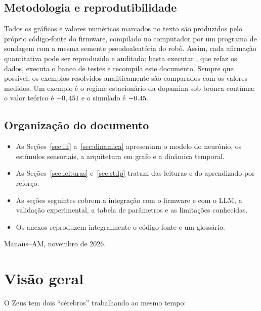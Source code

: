 \documentclass[11pt,a4paper]{article}
\DeclareRobustCommand{\arq}[1]{\texttt{\detokenize{#1}}}
\begin{document}
\subsection*{Metodologia e reprodutibilidade}

Todos os gráficos e valores numéricos marcados no texto são produzidos pelo próprio código-fonte do firmware, compilado no
computador por um programa de sondagem com a mesma semente pseudoaleatória do robô. Assim, cada afirmação quantitativa pode ser
reproduzida e auditada: basta executar \arq{docs/snn/gerar.bat}, que refaz os dados, executa o banco de testes e recompila este
documento. Sempre que possível, os exemplos resolvidos analiticamente são comparados com os valores medidos. Um exemplo é o regime
estacionário da dopamina sob bronca contínua: o valor teórico é $-0{,}451$ e o simulado é $-0.45$.

\subsection*{Organização do documento}

\begin{itemize}
  \item As Seções~\ref{sec:lif} a~\ref{sec:dinamica} apresentam o modelo do neurônio, os estímulos sensoriais, a arquitetura em
        grafo e a dinâmica temporal.
  \item As Seções~\ref{sec:leituras} e~\ref{sec:stdp} tratam das leituras e do aprendizado por reforço.
  \item As seções seguintes cobrem a integração com o firmware e com o LLM, a validação experimental, a tabela de parâmetros e as
        limitações conhecidas.
  \item Os anexos reproduzem integralmente o código-fonte e um glossário.
\end{itemize}

\vspace{0.8em}
\begin{flushright}
\small\color{cinza}Manaus–AM, novembro de 2026.
\end{flushright}

\newpage
\tableofcontents
\newpage

\section{Visão geral}

O Zeus tem dois “cérebros” trabalhando ao mesmo tempo:
\end{document}
